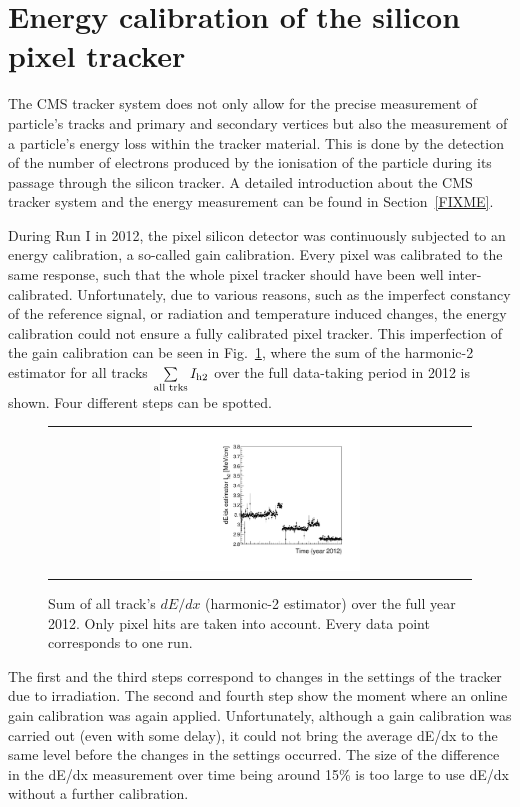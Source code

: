 \section{Energy calibration of the silicon pixel tracker}
The CMS tracker system does not only allow for the precise measurement of particle's tracks and primary and secondary vertices but also the measurement of a particle's energy loss within the tracker material.
This is done by the detection of the number of electrons produced by the ionisation of the particle during its passage through the silicon tracker.
A detailed introduction about the CMS tracker system and the energy measurement can be found in Section~\ref{FIXME}.

During Run I in 2012, the pixel silicon detector was continuously subjected to an energy calibration, a so-called gain calibration.
Every pixel was calibrated to the same response, such that the whole pixel tracker should have been well inter-calibrated.
Unfortunately, due to various reasons, such as the imperfect constancy of the reference signal, or radiation and temperature induced changes, the energy calibration could not ensure a fully calibrated pixel tracker.
This imperfection of the gain calibration can be seen in Fig.~\ref{fig:StabilityPlot_beforeCalibration}, where the sum of the harmonic-2 estimator for all tracks $\sum\limits_{\text{all trks}}I_{\text{h2}}$ over the full data-taking period in 2012 is shown.
Four different steps can be spotted.
\begin{figure}[!b]
  \centering 
  \begin{tabular}{c}
  \includegraphics[width=0.49\textwidth]{figures/analysis/StabilityPlot_Pixel_beforeCalibration_withoutStepFits_NEW.pdf}
  \end{tabular}
  \caption{Sum of all track's $dE/dx$ (harmonic-2 estimator) over the full year 2012. Only pixel hits are taken into account. Every data point corresponds to one run.} 
  \label{fig:StabilityPlot_beforeCalibration}
\end{figure}
The first and the third steps correspond to changes in the settings of the tracker due to irradiation.
The second and fourth step show the moment where an online gain calibration was again applied.
Unfortunately, although a gain calibration was carried out (even with some delay), it could not bring the average dE/dx to the same level before the changes in the settings occurred.
The size of the difference in the dE/dx measurement over time being around 15\% is too large to use dE/dx without a further calibration.

